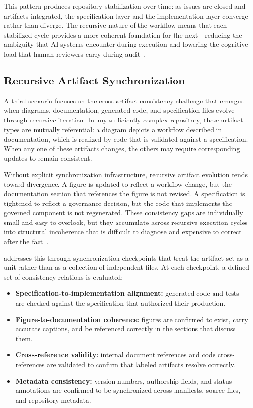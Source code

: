This pattern produces repository stabilization over time: as issues are closed and artifacts integrated, the specification layer and the implementation layer converge rather than diverge. The recursive nature of the workflow means that each stabilized cycle provides a more coherent foundation for the next---reducing the ambiguity that AI systems encounter during execution and lowering the cognitive load that human reviewers carry during audit~\cite{Sweller1988CognitiveLoad,Simon1957ModelsMan}.

\subsection{Recursive Artifact Synchronization}

A third scenario focuses on the cross-artifact consistency challenge that emerges when diagrams, documentation, generated code, and specification files evolve through recursive iteration. In any sufficiently complex repository, these artifact types are mutually referential: a diagram depicts a workflow described in documentation, which is realized by code that is validated against a specification. When any one of these artifacts changes, the others may require corresponding updates to remain consistent.

Without explicit synchronization infrastructure, recursive artifact evolution tends toward divergence. A figure is updated to reflect a workflow change, but the documentation section that references the figure is not revised. A specification is tightened to reflect a governance decision, but the code that implements the governed component is not regenerated. These consistency gaps are individually small and easy to overlook, but they accumulate across recursive execution cycles into structural incoherence that is difficult to diagnose and expensive to correct after the fact~\cite{Vogels2009EventuallyConsistent}.

 addresses this through synchronization checkpoints that treat the artifact set as a unit rather than as a collection of independent files. At each checkpoint, a defined set of consistency relations is evaluated:
\begin{itemize}
  \item \textbf{Specification-to-implementation alignment:} generated code and tests are checked against the specification that authorized their production.
  \item \textbf{Figure-to-documentation coherence:} figures are confirmed to exist, carry accurate captions, and be referenced correctly in the sections that discuss them.
  \item \textbf{Cross-reference validity:} internal document references and code cross-references are validated to confirm that labeled artifacts resolve correctly.
  \item \textbf{Metadata consistency:} version numbers, authorship fields, and status annotations are confirmed to be synchronized across manifests, source files, and repository metadata.
\end{itemize}

